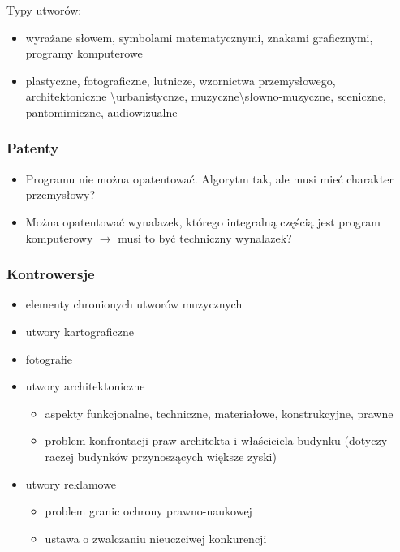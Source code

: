 \documentclass[12pt,a4paper]{article}
\begin{document}
Typy utworów:
\begin{itemize}
\item  wyrażane słowem, symbolami matematycznymi, znakami graficznymi, programy komputerowe
\item plastyczne, fotograficzne, lutnicze, wzornictwa przemysłowego, architektoniczne \textbackslash urbanistycnze, muzyczne\textbackslash słowno-muzyczne, sceniczne, pantomimiczne, audiowizualne
\end{itemize}

\subsubsection{Patenty}
\begin{itemize}
\item Programu nie można opatentować. Algorytm tak, ale musi mieć charakter przemysłowy?
\item Można opatentować wynalazek, którego integralną częścią jest program komputerowy $\rightarrow$ musi to być techniczny wynalazek?
\end{itemize}

\subsubsection{Kontrowersje}
\begin{itemize}
\item elementy chronionych utworów muzycznych
\item utwory kartograficzne
\item fotografie
\item utwory architektoniczne
	\begin{itemize}
		\item aspekty funkcjonalne, techniczne, materiałowe, konstrukcyjne, prawne
		\item problem konfrontacji praw architekta i właściciela budynku (dotyczy raczej budynków przynoszących większe zyski)
	\end{itemize}
\item utwory reklamowe
	\begin{itemize}
		\item  problem granic ochrony prawno-naukowej
		\item ustawa o zwalczaniu nieuczciwej konkurencji
	\end{itemize}
\end{itemize}
\end{document}
